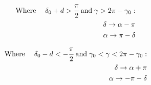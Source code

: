 \begin{eqnarray}
        \mathrm{Where}&\;& \delta_0+d>\cfrac{\pi}{2} \; \mathrm{and}\; \gamma>2\pi-\gamma_0:\nonumber\\
        & & \delta\rightarrow\alpha-\pi\nonumber\\
        & & \alpha\rightarrow\pi-\delta\nonumber\\
\end{eqnarray}
\begin{eqnarray}
        \mathrm{Where}&\;& \delta_0-d<-\cfrac{\pi}{2} \; \mathrm{and}\; \gamma_0<\gamma<2\pi-\gamma_0:\nonumber\\
        & & \delta\rightarrow\alpha+\pi\nonumber\\
        & & \alpha\rightarrow-\pi-\delta\nonumber\\
\end{eqnarray}


